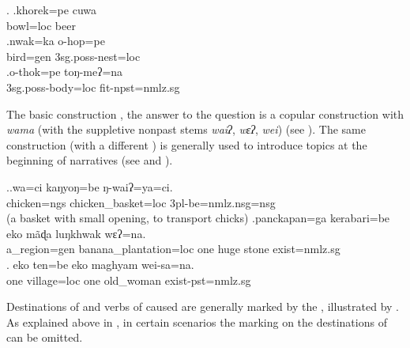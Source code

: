 \ex. \ag.khorek=pe cuwa\\
		bowl{\sc =loc} beer	\\
	 \bg.nwak=ka o-hop=pe\\
		bird{\sc =gen} {\sc 3sg.poss}-nest{\sc =loc}	\\
		\bg.o-thok=pe toŋ-meʔ=na\\
		{\sc 3sg.poss}-body{\sc =loc} fit{\sc [3sg]-npst=nmlz.sg}\\
	
The basic  construction \citep[15]{Levinsonetal2006_Grammars}, the answer to the question  is a copular construction with \emph{wama} (with the suppletive nonpast stems \emph{waiʔ}, \emph{wɛʔ}, \emph{wei})  (see \Next[a]). The same construction (with a different ) is generally used to introduce topics at the beginning of narratives (see \Next[b] and \Next[c]).


\ex.\ag.wa=ci kaŋyoŋ=be ŋ-waiʔ=ya=ci.\\
chicken{\sc =ngs} chicken\_basket{\sc =loc} {\sc 3pl-}be{\sc [npst]=nmlz.nsg=nsg}\\
 (a basket with small opening, to transport chicks)
\bg.panckapan=ga    kerabari=be        eko mãɖa luŋkhwak wɛʔ=na.\\
a\_region{\sc =gen} banana\_plantation{\sc =loc} one huge stone exist{\sc [3sg;npst]=nmlz.sg}\\
  
\bg. eko ten=be        eko maghyam  wei-sa=na.\\
one village{\sc =loc} one old\_woman exist{\sc [3sg;npst]-pst=nmlz.sg}\\
 
	
Destinations of  and verbs of caused  are generally marked by the , illustrated by \Next. As explained above in , in certain scenarios the  marking on the destinations of  can be omitted. 

